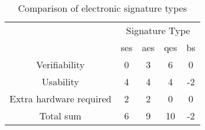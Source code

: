 \begin{table}[H]
	\begin{tabular}{|c|c|c|c|c|} \hline
		\rowcolor{Gray}\multirow{2}{*}{Criterion} & \multicolumn{4}{|c|}{Signature Type}\\
									& \gls{ses} & \gls{aes} & \gls{qes} & \gls{bs} \\ \cline{1-5}
		Verifiability 			& 0 & 3 & 6 & 0 \\ \hline
		Usability 				& 4 & 4 & 4 & -2 \\ \hline
		Extra hardware required & 2 & 2 & 0 & 0 \\ \hline \hline
		Total sum				& 6 & 9 & 10 & -2 \\ \hline
	\end{tabular}
	\centering
	\caption{Comparison of electronic signature types}
	\label{Tab:comp}
\end{table}